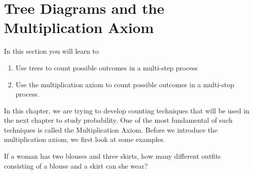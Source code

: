 \section{Tree Diagrams and the Multiplication Axiom}

In this section you will learn to
\begin{enumerate}
    \item Use trees to count possible outcomes in a multi-step process
    \item Use the multiplication axiom to count possible outcomes in a multi-stop process.
\end{enumerate}

In this chapter, we are trying to develop counting techniques that will be used in the next chapter to study probability.  One of the most fundamental of such techniques is called the Multiplication Axiom.  Before we introduce the multiplication axiom, we first look at some examples.

\begin{example}
    If a woman has two blouses and three skirts, how many different outfits consisting of a blouse and a skirt can she wear?
\end{example}

